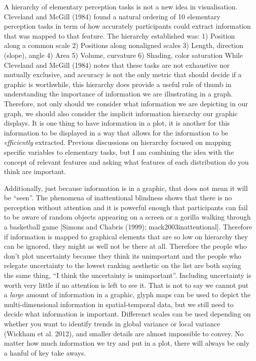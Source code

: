 \documentclass[
  letterpaper,
  DIV=11,
  numbers=noendperiod]{scrartcl}
\begin{document}
A hierarchy of elementary perception tasks is not a new idea in
visualisation. Cleveland and McGill (1984) found a natural ordering of
10 elementary perception tasks in term of how accurately participants
could extract information that was mapped to that feature. The hierarchy
established was: 1) Position along a common scale 2) Positions along
nonaligned scales 3) Length, direction (slope), angle 4) Area 5) Volume,
curvature 6) Shading, color saturation While Cleveland and McGill (1984)
notes that these tasks are not exhaustive nor mutually exclusive, and
accuracy is not the only metric that should decide if a graphic is
worthwhile, this hierarchy does provide a useful rule of thumb in
understanding the importance of information we are illustrating in a
graph. Therefore, not only should we consider what information we are
depicting in our graph, we should also consider the implicit information
hierarchy our graphic displays. It is one thing to have information in a
plot, it is another for this information to be displayed in a way that
allows for the information to be \emph{efficiently} extracted. Previous
discussions on hierarchy focused on mapping specific variables to
elementary tasks, but I am combining the idea with the concept of
relevant features and asking what features of each distribution do you
think are important.

Additionally, just because information is in a graphic, that does not
mean it will be ``seen''. The phenomena of inattentional blindness shows
that there is no perception without attention and it is powerful enough
that participants can fail to be aware of random objects appearing on a
screen or a gorilla walking through a basketball game {[}Simons and
Chabris (1999); mack2003inattentional{]}. Therefore if information is
mapped to graphical elements that are so low on hierarchy they can be
ignored, they might as well not be there at all. Therefore the people
who don't plot uncertainty because they think its unimportant and the
people who relegate uncertainty to the lowest ranking aesthetic on the
list are both saying the same thing, ``I think the uncertainty is
unimportant''. Including uncertainty is worth very little if no
attention is left to see it. That is not to say we cannot put a
\emph{large} amount of information in a graphic, glyph maps can be used
to depict the multi-dimensional information in spatial-temporal data,
but we still need to decide what information is important. Differenct
scales can be used depending on whether you want to identify trends in
global variance or local variance (Wickham et al. 2012), and smaller
details are almost impossible to convey. No matter how much information
we try and put in a plot, there will always be only a hanful of key take
aways.
\end{document}
